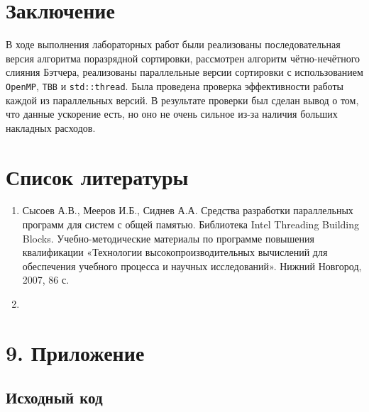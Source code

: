 \documentclass{report}
\begin{document}
    \clearpage
    \section*{Заключение}
    В ходе выполнения лабораторных работ были реализованы последовательная версия алгоритма поразрядной сортировки, рассмотрен алгоритм чётно-нечётного слияния Бэтчера, реализованы параллельные версии сортировки с использованием \verb|OpenMP|, \verb|TBB| и \verb|std::thread|. Была проведена проверка эффективности работы каждой из параллельных версий. В результате проверки был сделан вывод о том, что данные ускорение есть, но оно не очень сильное из-за наличия больших накладных расходов.

    \newpage
    \section*{Список литературы}
    \begin{enumerate}
        \item Сысоев А.В., Мееров И.Б., Сиднев А.А. Средства разработки параллельных программ для систем с общей памятью. Библиотека Intel Threading Building Blocks. Учебно-методические материалы по программе повышения квалификации «Технологии высокопроизводительных вычислений для обеспечения учебного процесса и научных исследований». Нижний Новгород, 2007, 86 с.
        \item 
    \end{enumerate}

    \newpage
    \section*{9. Приложение}

    \subsection*{Исходный код}
\end{document}
